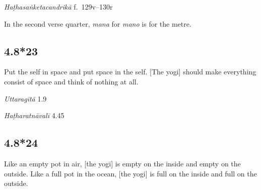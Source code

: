 \begin{ekdosis}
\begin{testimonia}[hp04_008_22]
\emph{Haṭhasaṅketacandrikā} f.~129v–130r
\begin{versinnote}
\end{versinnote}
\end{testimonia}

\begin{philcomm}[hp04_008_22]
In the second verse quarter, \emph{mana} for \emph{mano} is for the metre.
\end{philcomm}

\subsection*{4.8*23}
\begin{translation}[hp04_008_23]
Put the self in space and put space in the self. [The yogi] should make everything consist of space and think of nothing at all.
\end{translation}

\begin{sources}[hp04_008_23]
\emph{Uttaragītā} 1.9%
\begin{versinnote}
\end{versinnote}
\end{sources}

\begin{testimonia}[hp04_008_23]
\emph{Haṭharatnāvalī} 4.45
\begin{versinnote}
\end{versinnote}
\end{testimonia}


\subsection*{4.8*24}
\begin{translation}[hp04_008_24]
Like an empty pot in air, [the yogī] is empty on the inside and empty on the outside. Like a full pot in the ocean, [the yogi] is full on the inside and full on the outside.%
\end{translation}


\end{ekdosis}

